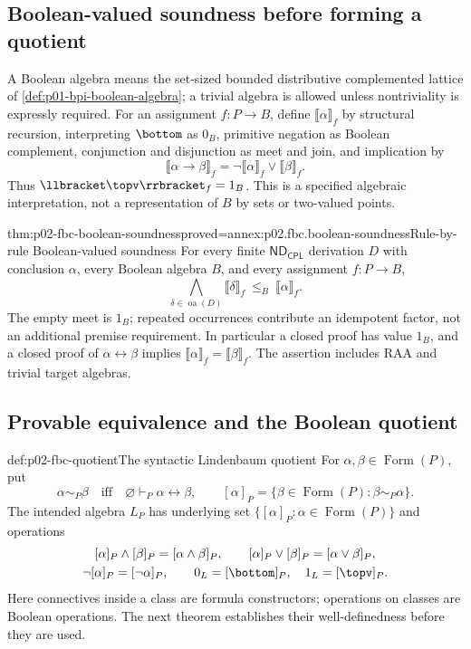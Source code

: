\subsection{Boolean-valued soundness before forming a quotient}
\label{sec:p02-fbc-boolean-soundness}

A Boolean algebra means the set-sized bounded distributive complemented
lattice of \cref{def:p01-bpi-boolean-algebra}; a trivial algebra is
allowed unless nontriviality is expressly required.
For an assignment \(f:P\to B\), define
\(\llbracket\alpha\rrbracket_f\) by structural recursion, interpreting
\(\bottom\) as \(0_B\), primitive negation as Boolean complement,
conjunction and disjunction as meet and join, and implication by
\[
 \llbracket\alpha\to\beta\rrbracket_f
       =\neg\llbracket\alpha\rrbracket_f
                         \vee\llbracket\beta\rrbracket_f .
\]
Thus \(\llbracket\topv\rrbracket_f=1_B\).
This is a specified algebraic interpretation, not a representation
of \(B\) by sets or two-valued points.

\begin{hblemma}{thm:p02-fbc-boolean-soundness}{proved=annex:p02.fbc.boolean-soundness}{Rule-by-rule Boolean-valued soundness}
For every finite \(\mathsf{ND}_{\mathsf{CPL}}\) derivation \(D\)
with conclusion \(\alpha\), every Boolean algebra \(B\), and every
assignment \(f:P\to B\),
\[
 \bigwedge_{\delta\in\operatorname{oa}(D)}
                   \llbracket\delta\rrbracket_f
                 \ \leq_B\ \llbracket\alpha\rrbracket_f .
\]
The empty meet is \(1_B\); repeated occurrences contribute an idempotent
factor, not an additional premise requirement.
In particular a closed proof has value \(1_B\), and a closed proof
of \(\alpha\leftrightarrow\beta\) implies
\(\llbracket\alpha\rrbracket_f=\llbracket\beta\rrbracket_f\).
The assertion includes RAA and trivial target algebras.
\end{hblemma}

\subsection{Provable equivalence and the Boolean quotient}
\label{sec:p02-fbc-quotient}

\begin{hbdefinition}{def:p02-fbc-quotient}{The syntactic Lindenbaum quotient}
For \(\alpha,\beta\in\operatorname{Form}(P)\), put
\[
 \alpha\sim_P\beta
   \quad\text{iff}\quad
 \varnothing\vdash_P\alpha\leftrightarrow\beta,
 \qquad
 [\alpha]_P=\{\beta\in\operatorname{Form}(P):\beta\sim_P\alpha\}.
\]
The intended algebra \(L_P\) has underlying set
\(\{[\alpha]_P:\alpha\in\operatorname{Form}(P)\}\) and operations
\[
\begin{gathered}
 [\alpha]_P\wedge[\beta]_P=[\alpha\land\beta]_P,\qquad
 [\alpha]_P\vee[\beta]_P=[\alpha\lor\beta]_P,\\
 \neg[\alpha]_P=[\neg\alpha]_P,\qquad
 0_L=[\bottom]_P,\quad 1_L=[\topv]_P .
\end{gathered}
\]
Here connectives inside a class are formula constructors; operations
on classes are Boolean operations. The next theorem establishes their
well-definedness before they are used.
\end{hbdefinition}

